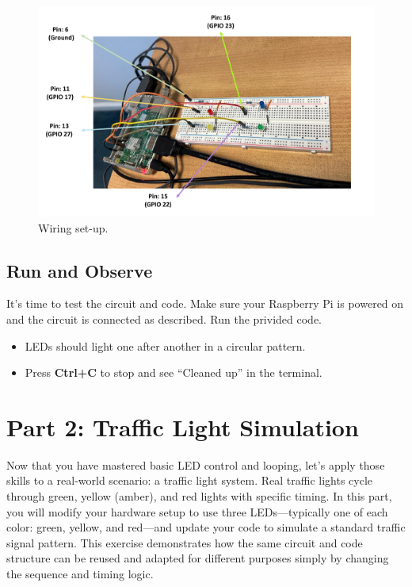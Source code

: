 \documentclass[a4paper,11pt]{article}
\begin{document}
\begin{figure}[h] %
    \centering
    \includegraphics[width=1\textwidth]{fig2.pdf} %
    \caption{Wiring set-up.}
    \label{fig:runtime1}
\end{figure}

\subsection*{Run and Observe}
It’s time to test the circuit and code. Make sure your 
Raspberry Pi is powered on and the circuit is connected as described. 
Run the privided code.

\begin{itemize}
    \item LEDs should light one after another in a circular pattern.
    \item Press \textbf{Ctrl+C} to stop and see “Cleaned up” in the terminal.
\end{itemize}

\newpage
\section*{Part 2: Traffic Light Simulation }
Now that you have mastered basic LED control and looping, let's 
apply those skills to a real-world scenario: a traffic light system.
Real traffic lights cycle through green, yellow (amber), and red lights with specific timing. 
In this part, you will modify your hardware setup to use three 
LEDs—typically one of each color: green, yellow, and red—and update 
your code to simulate a standard traffic signal pattern. 
This exercise demonstrates how the same circuit and code structure can be 
reused and adapted for different purposes simply by changing the sequence and timing logic.
\end{document}
